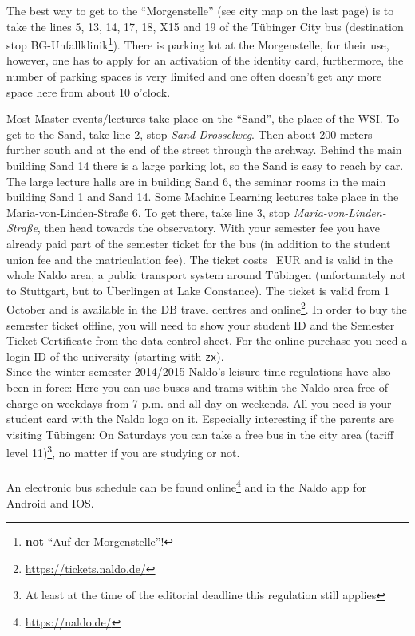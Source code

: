 \ifml

The best way to get to the "`Morgenstelle"' (see city map on the last page) is to take the lines 5, 13, 14, 17, 18, X15 and 19 of the Tübinger
City bus (destination stop BG-Unfallklinik\footnote{\textbf{not} "`Auf der Morgenstelle"'!}). There is parking lot at the Morgenstelle,
for their use, however, one has to apply for an activation of the identity card, furthermore, the number of parking spaces is very limited and one often doesn't get any more space here from about 10 o'clock.

\ifmaster
Most Master events/lectures take place on the "`Sand"', the place of the WSI. To get to the Sand, take line 2, stop \emph{Sand Drosselweg}. Then about 200 meters further south and at the end of the street through the archway. Behind the main building Sand 14 there is a large parking lot, so the Sand is easy to reach by car. The large lecture halls are in building Sand 6, the seminar rooms in the main building Sand 1 and Sand 14. Some Machine Learning lectures take place in the
Maria-von-Linden-Straße 6. To get there, take line 3, stop \emph{Maria-von-Linden-Straße}, then head towards the observatory.
\fi
With your semester fee you have already paid part of the semester ticket for the bus (in addition to the student union fee and the matriculation fee).
The ticket costs \ticketpreis~EUR and is valid in the whole Naldo area, a public transport system around
Tübingen (unfortunately not to Stuttgart, but to Überlingen at Lake Constance). The ticket is valid from 1 October and is available in the DB travel centres and online\footnote{\url{https://tickets.naldo.de/}}. In order to buy the semester ticket offline, you will need to show your student ID and the Semester Ticket Certificate from the data control sheet. For the online purchase you need a login ID of the university (starting with \texttt{zx}).\\
Since the winter semester 2014/2015 Naldo's leisure time regulations have also been in force: Here you can use buses and trams within the Naldo area free of charge on weekdays from 7 p.m. and all day on weekends. All you need is your student card with the Naldo logo on it.
Especially interesting if the parents are visiting Tübingen: On Saturdays you can take a free bus in the city area (tariff level 11)\footnote{At least at the time of the editorial deadline this regulation still applies}, no matter if you are studying or not.\\ \\
An electronic bus schedule can be found online\footnote{\url{https://naldo.de/}} and in the Naldo app for Android and IOS.


